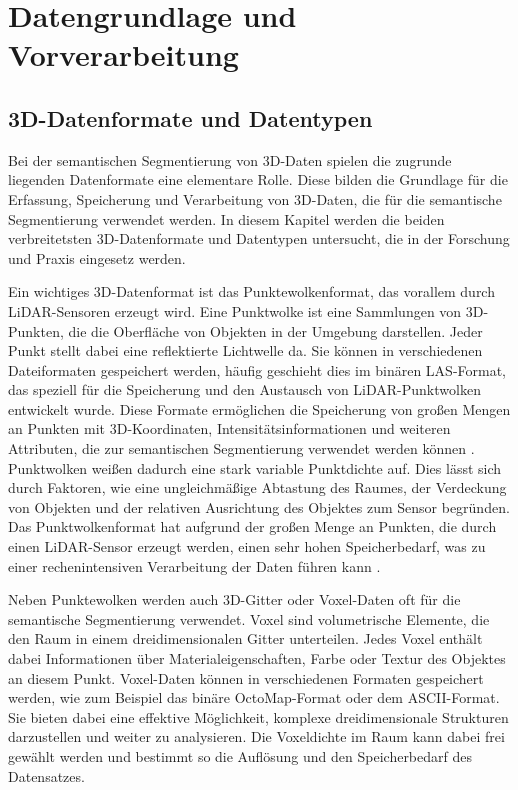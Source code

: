 \chapter{Datengrundlage und Vorverarbeitung}
\section{3D-Datenformate und Datentypen}
Bei der semantischen Segmentierung von 3D-Daten spielen die zugrunde liegenden
Datenformate eine elementare Rolle. Diese bilden die Grundlage für die
Erfassung, Speicherung und Verarbeitung von 3D-Daten, die für die semantische
Segmentierung verwendet werden. In diesem Kapitel werden die beiden
verbreitetsten 3D-Datenformate und Datentypen untersucht, die in der Forschung
und Praxis eingesetz werden.

Ein wichtiges 3D-Datenformat ist das Punktewolkenformat, das vorallem durch
LiDAR-Sensoren erzeugt wird. Eine Punktwolke ist eine Sammlungen von
3D-Punkten, die die Oberfläche von Objekten in der Umgebung darstellen. Jeder
Punkt stellt dabei eine reflektierte Lichtwelle da. Sie können in verschiedenen
Dateiformaten gespeichert werden, häufig geschieht dies im binären LAS-Format,
das speziell für die Speicherung und den Austausch von LiDAR-Punktwolken
entwickelt wurde. Diese Formate ermöglichen die Speicherung von großen Mengen
an Punkten mit 3D-Koordinaten, Intensitätsinformationen und weiteren
Attributen, die zur semantischen Segmentierung verwendet werden können
\cite{.2020b}. Punktwolken weißen dadurch eine stark variable Punktdichte auf.
Dies lässt sich durch Faktoren, wie eine ungleichmäßige Abtastung des Raumes,
der Verdeckung von Objekten und der relativen Ausrichtung des Objektes zum
Sensor begründen. Das Punktwolkenformat hat aufgrund der großen Menge an
Punkten, die durch einen LiDAR-Sensor erzeugt werden, einen sehr hohen
Speicherbedarf, was zu einer rechenintensiven Verarbeitung der Daten führen
kann \cite{8578570}.

Neben Punktewolken werden auch 3D-Gitter oder Voxel-Daten oft für die
semantische Segmentierung verwendet. Voxel sind volumetrische Elemente, die den
Raum in einem dreidimensionalen Gitter unterteilen. Jedes Voxel enthält dabei
Informationen über Materialeigenschaften, Farbe oder Textur des Objektes an
diesem Punkt. Voxel-Daten können in verschiedenen Formaten gespeichert werden,
wie zum Beispiel das binäre OctoMap-Format oder dem ASCII-Format. Sie bieten
dabei eine effektive Möglichkeit, komplexe dreidimensionale Strukturen
darzustellen und weiter zu analysieren. Die Voxeldichte im Raum kann dabei frei
gewählt werden und bestimmt so die Auflösung und den Speicherbedarf des
Datensatzes.

